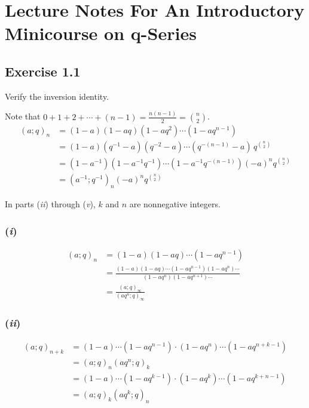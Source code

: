 

\maketitle

\tableofcontents
\clearpage{}


\section*{Lecture Notes For An Introductory Minicourse on q-Series}\label{sec:lecture}

\subsection*{Exercise 1.1} Verify the inversion identity.

\vspace{1.0em}
\noindent
Note that $0+1+2+\cdots+(n-1)=\frac{n(n-1)}{2}=\binom{n}{2}$.
\begin{align*}
    (a;q)_n &= (1-a)(1-aq)(1-aq^{2})\cdots(1-aq^{n-1})\\
    &= (1-a)(q^{-1}-a)(q^{-2}-a)\cdots(q^{-(n-1)}-a)\,q^{\binom{n}{2}}\\
    &= (1-a^{-1})(1-a^{-1}q^{-1})\cdots(1-a^{-1}q^{-(n-1)})(-a)^n q^{\binom{n}{2}}\\
    &= (a^{-1};q^{-1})_n (-a)^{n} q^{\binom{n}{2}}
\end{align*}

\vspace{1.0em}
\noindent
In parts (\textit{ii}) through (\textit{v}), $k$ and $n$ are nonnegative integers.

\subsubsection*{(\textit{i})}\label{subsubsec:1.1(i)}
\begin{align*}
    (a;q)_n &=(1-a)(1-aq)\cdots(1-aq^{n-1})\\[0.5em]
    &=\frac{(1-a)(1-aq)\cdots(1-aq^{n-1})(1-aq^n)\cdots}{(1-aq^n)(1-aq^{n+1})\cdots}\\
    &=\frac{(a;q)_\infty}{(aq^n;q)_\infty}
\end{align*}

\subsubsection*{(\textit{ii})}\label{subsubsec:1.1(ii)}
\begin{align*}
    (a;q)_{n+k} &= (1-a)\cdots(1-aq^{n-1})\cdot(1-aq^n)\cdots(1-aq^{n+k-1})\\
    &= (a;q)_n(aq^n;q)_k\\
    &= (1-a)\cdots(1-aq^{k-1})\cdot(1-aq^k)\cdots(1-aq^{k+n-1})\\
    &= (a;q)_k(aq^k;q)_n
\end{align*}

